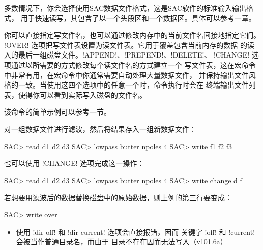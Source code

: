 多数情况下，你会选择使用SAC数据文件格式，这是SAC软件的标准输入输出格式，
用于快速读写，其包含了以一个头段区和一个数据区。具体可以参考一章。

你可以直接指定写文件名，也可以通过修改内存中的当前文件名间接地指定它们。
!OVER! 选项把写文件表设置为读文件表。它用于覆盖包含当前内存的数据
的读入的最后一组磁盘文件。!APPEND!、!PREPEND!、!DELETE!、
!CHANGE! 选项通过以所需要的方式修改每个读文件名的方式建立一个
写文件表，这在宏命令中非常有用，在宏命令中你通常需要自动处理大量数据文件，
并保持输出文件风格的一致。当使用这四个选项中的任意一个时，命令执行时会在
终端输出文件列表，使得你可以看到实际写入磁盘的文件名。

该命令的简单示例可以参考一节。

对一组数据文件进行滤波，然后将结果存入一组新数据文件：
\begin{SACCode}
SAC> read d1 d2 d3
SAC> lowpass butter npoles 4
SAC> write f1 f2 f3
\end{SACCode}

也可以使用 !CHANGE! 选项完成这一操作：
\begin{SACCode}
SAC> read d1 d2 d3
SAC> lowpass butter npoles 4
SAC> write change d f
\end{SACCode}

若想要用滤波后的数据替换磁盘中的原始数据，则上例的第三行要变成：
\begin{SACCode}
SAC> write over
\end{SACCode}

\begin{itemize}
\item 使用 !dir off! 和 !dir current! 选项会直接报错，因而
    关键字 !off! 和 !current! 会被当作普通目录名，而由于
    目录不存在因而无法写入（v101.6a）
\end{itemize}
